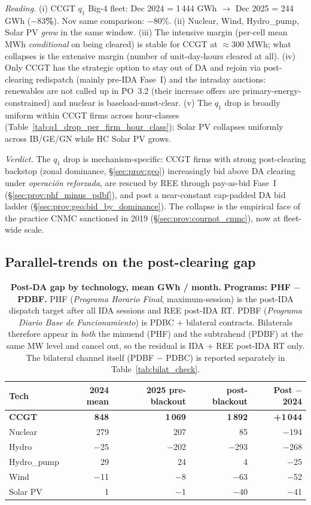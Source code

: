 \documentclass[11pt,a4paper]{article}
\begin{document}
\textit{Reading.} (i) CCGT $q_1$ Big-4 fleet: Dec 2024 = 1\,444 GWh $\to$ Dec 2025 = 244 GWh (\textbf{$-83$\%}). Nov same comparison: $-80$\%. (ii) Nuclear, Wind, Hydro\_pump, Solar PV \emph{grow} in the same window. (iii) The intensive margin (per-cell mean MWh \emph{conditional} on being cleared) is stable for CCGT at $\approx$300 MWh; what collapses is the extensive margin (number of unit-day-hours cleared at all). (iv) Only CCGT has the strategic option to stay out of DA and rejoin via post-clearing redispatch (mainly pre-IDA Fase~I) and the intraday auctions: renewables are not called up in PO~3.2 (their increase offers are primary-energy-constrained) and nuclear is baseload-must-clear. (v) The $q_1$ drop is broadly uniform within CCGT firms across hour-classes (Table~\ref{tab:q1_drop_per_firm_hour_class}); Solar PV collapses uniformly across IB/GE/GN while HC Solar PV grows.

\textit{Verdict.} The $q_1$ drop is mechanism-specific: CCGT firms with strong post-clearing backstop (zonal dominance, \S\ref{sec:prov:geo}) increasingly bid above DA clearing under \emph{operación reforzada}, are rescued by REE through pay-as-bid Fase~I (\S\ref{sec:prov:phf_minus_pdbf}), and post a near-constant cap-padded DA bid ladder (\S\ref{sec:prov:geo:bid_by_dominance}). The collapse is the empirical face of the practice CNMC sanctioned in 2019 (\S\ref{sec:prov:cournot_cnmc}), now at fleet-wide scale.

\subsection{Parallel-trends on the post-clearing gap}\label{sec:prov:q1_drop:parallel}

\begin{table}[H]
\centering
\caption{\textbf{Post-DA gap by technology, mean GWh / month.} \textbf{Programs: PHF $-$ PDBF.} PHF (\emph{Programa Horario Final}, maximum-session) is the post-IDA dispatch target after all IDA sessions and REE post-IDA RT. PDBF (\emph{Programa Diario Base de Funcionamiento}) is PDBC $+$ bilateral contracts. Bilaterals therefore appear in \emph{both} the minuend (PHF) and the subtrahend (PDBF) at the same MW level and cancel out, so the residual is IDA + REE post-IDA RT only. The bilateral channel itself (PDBF $-$ PDBC) is reported separately in Table~\ref{tab:bilat_check}.}
\label{tab:gap_pretrends}
\begin{tabular}{l r r r r}
\toprule
Tech & 2024 mean & 2025 pre-blackout & post-blackout & Post $-$ 2024 \\
\midrule
\textbf{CCGT} & \textbf{848} & \textbf{1\,069} & \textbf{1\,892} & \textbf{+1\,044} \\
Nuclear & 279 & 207 & 85 & $-$194 \\
Hydro & $-$25 & $-$202 & $-$293 & $-$268 \\
Hydro\_pump & 29 & 24 & 4 & $-$25 \\
Wind & $-$11 & $-$8 & $-$63 & $-$52 \\
Solar PV & 1 & $-$1 & $-$40 & $-$41 \\
\bottomrule
\end{tabular}
\end{table}
\end{document}
